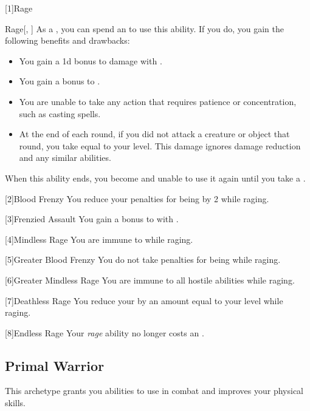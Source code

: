         [1]{Rage}
        \begin{ability}{Rage}[, ]
            As a , you can spend an  to use this ability.
            If you do, you gain the following benefits and drawbacks:
            \begin{itemize}
                \item You gain a \plus1d bonus to damage with .
                \item You gain a  bonus to .
                \item You are unable to take any action that requires patience or concentration, such as casting spells.
                \item At the end of each round, if you did not attack a creature or object that round, you take  equal to your level.
                    This damage ignores damage reduction and any similar abilities.
            \end{itemize}
            When this ability ends, you become \fatigued and unable to use it again until you take a .
        \end{ability}

        [2]{Blood Frenzy}
        You reduce your penalties for being  by 2 while raging.

        [3]{Frenzied Assault}
        You gain a  bonus to  with .

        [4]{Mindless Rage}
        You are immune to   while raging.

        [5]{Greater Blood Frenzy} 
        You do not take penalties for being  while raging.

        [6]{Greater Mindless Rage} 
        You are immune to all hostile  abilities while raging.

        [7]{Deathless Rage} 
        You reduce your  by an amount equal to your level while raging.

        [8]{Endless Rage}
        Your \textit{rage} ability no longer costs an .

    \subsection{Primal Warrior}
        This archetype grants you abilities to use in combat and improves your physical skills.

